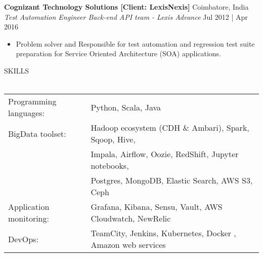 \documentclass[a4paper]{article}
\newcommand{\lineunder} {
    \vspace*{-8pt} \\
    \hspace*{-18pt} \hrulefill \\
}
\newcommand{\header} [1] {
    {\hspace*{-18pt}\vspace*{6pt} \textsc{#1}}
    \vspace*{-6pt} \lineunder
}
\begin{document}
\textbf{Cognizant Technology Solutions [Client: LexisNexis]} \hfill Coimbatore, India\\
\textit{Test Automation Engineer \textbar{} Back-end API team - Lexis Advance} \hfill Jul 2012 | Apr 2016\\
\vspace{-1.5mm}
\begin{itemize} \itemsep 1pt
	\item Problem solver and Responsible for test automation and regression test suite preparation for Service Oriented Architecture (SOA) applications. 
\end{itemize}

\header{SKILLS}
\begin{tabular}{ l l}
	Programming languages:  & Python, Scala, Java
	\\
	BigData toolset:        & Hadoop ecosystem (CDH \& Ambari), Spark, Sqoop, Hive,
	\\
	                        & Impala, Airflow, Oozie, RedShift, Jupyter notebooks,
	\\
	                        & Postgres, MongoDB, Elastic Search, AWS S3, Ceph
	\\
	Application monitoring: & Grafana, Kibana, Sensu, Vault, AWS Cloudwatch, NewRelic
	\\
	DevOps:                 & TeamCity, Jenkins, Kubernetes, Docker , Amazon web services
    \\
\end{tabular}
\vspace{2mm}

\end{document}
